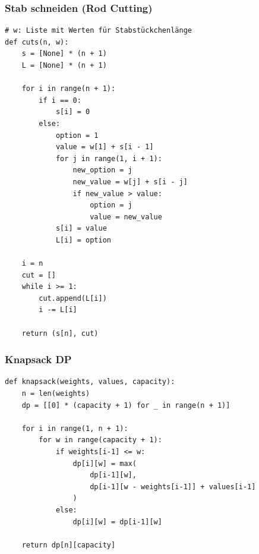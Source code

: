 \subsubsection{Stab schneiden (Rod Cutting)}
\begin{codebox}
\begin{lstlisting}[style=CodeExpert]
# w: Liste mit Werten für Stabstückchenlänge
def cuts(n, w):
    s = [None] * (n + 1)
    L = [None] * (n + 1)

    for i in range(n + 1):
        if i == 0:
            s[i] = 0
        else:
            option = 1
            value = w[1] + s[i - 1]
            for j in range(1, i + 1):
                new_option = j
                new_value = w[j] + s[i - j]
                if new_value > value:
                    option = j
                    value = new_value
            s[i] = value
            L[i] = option

    i = n
    cut = []
    while i >= 1:
        cut.append(L[i])
        i -= L[i]

    return (s[n], cut)
\end{lstlisting}
\end{codebox}

\subsubsection{Knapsack DP}
\begin{codebox}
\begin{lstlisting}[style=CodeExpert]
def knapsack(weights, values, capacity):
    n = len(weights)
    dp = [[0] * (capacity + 1) for _ in range(n + 1)]

    for i in range(1, n + 1):
        for w in range(capacity + 1):
            if weights[i-1] <= w:
                dp[i][w] = max(
                    dp[i-1][w],
                    dp[i-1][w - weights[i-1]] + values[i-1]
                )
            else:
                dp[i][w] = dp[i-1][w]

    return dp[n][capacity]
\end{lstlisting}
\end{codebox}




